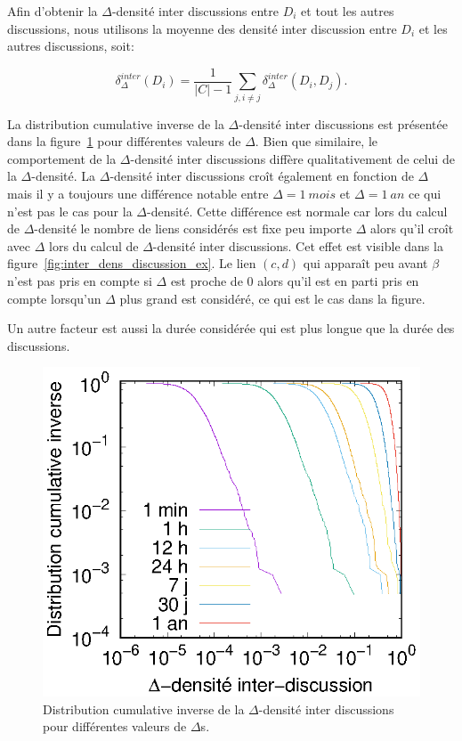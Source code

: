 Afin d'obtenir la $\Delta$-densité inter discussions entre $D_i$ et tout les autres discussions, nous utilisons la moyenne des densité inter discussion entre $D_i$ et les autres discussions, soit:

\begin{equation}
	\delta^{inter}_{\Delta}(D_i) = \frac{1}{|C|-1}\sum_{j,i\ne j} \delta^{inter}_{\Delta}(D_i,D_j).
\end{equation}

La distribution cumulative inverse de la $\Delta$-densité inter discussions est présentée dans la figure~\ref{fig:inter_dens_discussion} pour différentes valeurs de $\Delta$.
Bien que similaire, le comportement de la $\Delta$-densité inter discussions diffère qualitativement de celui de la $\Delta$-densité.
La $\Delta$-densité inter discussions croît également en fonction de $\Delta$ mais il y a toujours une différence notable entre $\Delta= 1\  mois$ et $\Delta= 1\ an$ ce qui n'est pas le cas pour la $\Delta$-densité.
Cette différence est normale car lors du calcul de $\Delta$-densité le nombre de liens considérés est fixe peu importe $\Delta$ alors qu'il croît avec $\Delta$ lors du calcul de $\Delta$-densité inter discussions.
Cet effet est visible dans la figure~\ref{fig:inter_dens_discussion_ex}.
Le lien $(c,d)$ qui apparaît peu avant $\beta$ n'est pas pris en compte si $\Delta$ est proche de $0$ alors qu'il est en parti pris en compte lorsqu'un $\Delta$ plus grand est considéré, ce qui est le cas dans la figure.

Un autre facteur est aussi la durée considérée qui est plus longue que la durée des discussions.
\begin{figure}
\centering
	\includegraphics[width=0.4\linewidth]{img/mailing/inter_delta.eps}
\caption{Distribution cumulative inverse de la $\Delta$-densité inter discussions pour différentes valeurs de $\Delta$s.}
\label{fig:inter_dens_discussion}
\end{figure}

\bigskip

